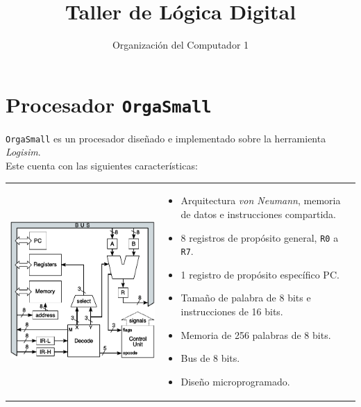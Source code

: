 \documentclass[a4paper,11pt]{article}
\title{Taller de L\'ogica Digital}
\author{Organizaci\'on del Computador 1}
\date{}
\begin{document}
\maketitle

\section*{Procesador \texttt{OrgaSmall}}

\texttt{OrgaSmall} es un procesador diseñado e implementado sobre la herramienta \emph{Logisim}.\\
\noindent Este cuenta con las siguientes características:

\begin{center}
\begin{tabular}[c]{p{6cm}p{7cm}}
\includegraphics[scale=0.7]{img/arquitectura_micro.pdf}
&
\vspace{-6cm}
\begin{minipage}{8cm}
\begin{itemize}
  \setlength\itemsep{0em}
 \item Arquitectura \emph{von Neumann}, memoria de datos e instrucciones compartida.
 \item 8 registros de propósito general, \texttt{R0} a \texttt{R7}.
 \item 1 registro de propósito específico PC.
 \item Tamaño de palabra de 8 bits e instrucciones de 16 bits.
 \item Memoria de 256 palabras de 8 bits.
 \item Bus de 8 bits.
 \item Diseño microprogramado.
\end{itemize}
\end{minipage}
\\
\end{tabular}
\end{center}
\end{document}
